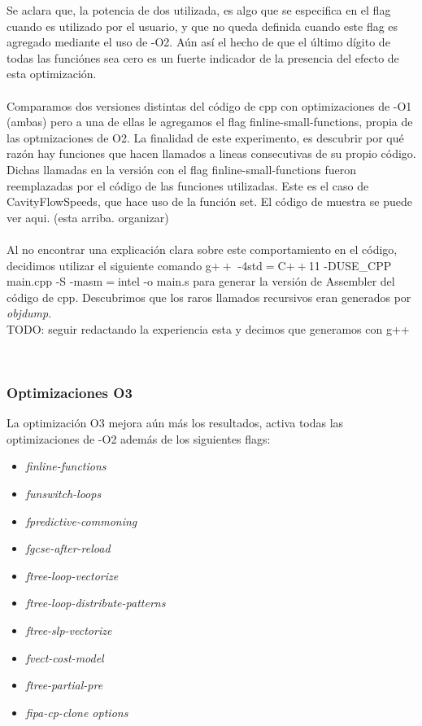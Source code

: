 Se aclara que, la potencia de dos utilizada, es algo que se especifica en el flag cuando es utilizado por el usuario, y que no queda definida cuando este flag es agregado mediante el uso de -O2. Aún así el hecho de que el último dígito de todas las funciónes sea cero es un fuerte indicador de la presencia del efecto de esta optimización.~\\
~\\
Comparamos dos versiones distintas del código de cpp con optimizaciones de -O1 (ambas) pero a una de ellas le agregamos el flag finline-small-functions, propia de las optmizaciones de O2. La finalidad de este experimento, es descubrir por qué razón hay funciones que hacen llamados a lineas consecutivas de su propio código.\\
Dichas llamadas en la versión con el flag finline-small-functions fueron reemplazadas por el código de las funciones utilizadas. Este es el caso de CavityFlowSpeeds, que hace uso de la función set. El código de muestra se puede ver aqui. (esta arriba. organizar)
~\\
~\\
Al no encontrar una explicación clara sobre este comportamiento en el código, decidimos utilizar el siguiente comando g$++$ -4std$=$C$++$11 -DUSE\_CPP main.cpp  -S -masm$=$intel -o main.s para generar la versión de Assembler del código de cpp. Descubrimos que los raros llamados recursivos eran generados por \textit{objdump}.
~\\

\colorbox{BurntOrange}{TODO: seguir redactando la experiencia esta y decimos que generamos con g++}

~\\


\subsubsection{Optimizaciones O3}

La optimización O3 mejora aún más los resultados, activa todas las optimizaciones de -O2 además de los siguientes flags:
~\\
\begin{itemize}
\item \textit{finline-functions}
\item \textit{funswitch-loops}
\item \textit{fpredictive-commoning}
\item \textit{fgcse-after-reload}
\item \textit{ftree-loop-vectorize}
\item \textit{ftree-loop-distribute-patterns}
\item \textit{ftree-slp-vectorize}
\item \textit{fvect-cost-model}
\item \textit{ftree-partial-pre}
\item \textit{fipa-cp-clone options}
\end{itemize}

